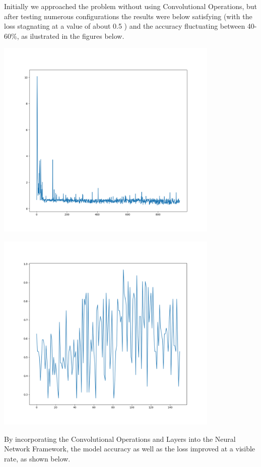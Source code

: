 Initially we approached the problem without using Convolutional Operations, but after testing numerous configurations
the results were below satisfying (with the loss stagnating at a value of about 0.5 ) and the accuracy fluctuating between 40-60\%, as ilustrated in the figures below.


\begin{center}
	\centering
	\includegraphics[width = 4.2in]{images/badmetricspng.png}
	\centerline{}
\label{bad_metrics}
\end{center}


\begin{center}
	\centering
	\includegraphics[width = 4.2in]{images/badacc.png}
	\centerline{}
\label{bad_metrics2}
\end{center}
By incorporating the Convolutional Operations and Layers into the Neural Network Framework, the model accuracy as well
as the loss improved at a visible rate, as shown below.


